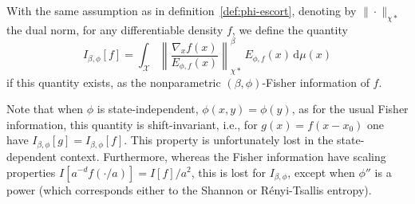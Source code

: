 \documentclass[entropy,article,submit,moreauthors,pdftex]{Definitions/mdpi}
\def\dmu{\mathrm{d}\mu}%
\def\X{\mathcal{X}}%
\begin{document}
\begin{Definition}
\label{def:np-phi-Fisher}
%
  With the  same assumption  as in definition~\ref{def:phi-escort},  denoting by
  $\| \cdot  \|_{\chi*}$ the dual norm,  for any differentiable density  $f$, we
  define the quantity
  \begin{equation}\label{eq:np-phi-Fisher}
  I_{\beta,\phi}[f] = \int_\X \left\| \frac{\nabla_x f(x)}{E_{\phi,f}(x)}
    \right\|_{\chi*}^\beta \, E_{\phi,f}(x) \, \dmu(x)
  \end{equation}
  if   this  quantity   exists,  as   the   nonparametric  $(\beta,\phi)$-Fisher
  information of $f$.
\end{Definition}
%
Note that  when $\phi$ is state-independent,  $\phi(x,y) = \phi(y)$, as  for the
usual Fisher  information, this quantity  is shift-invariant, i.e., for  $g(x) =
f(x-x_0)$  one have  $I_{\beta,\phi}[g] =  I_{\beta,\phi}[f]$. This  property is
unfortunately  lost in  the state-dependent  context.  Furthermore,  whereas the
Fisher information  have scaling  properties $I[a^{-d} f(\cdot/a)]  = I[f]/a^2$,
this  is lost  for  $I_{\beta,\phi}$, except  when $\phi''$  is  a power  (which
corresponds either to the Shannon or R\'enyi-Tsallis entropy).
\end{document}
